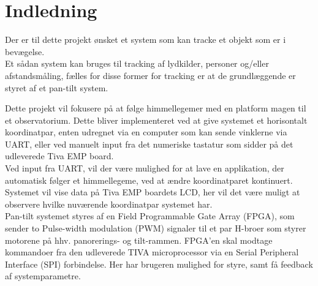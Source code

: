 \section{Indledning}
Der er til dette projekt ønsket et system som kan tracke et objekt som er i bevægelse.\\
Et sådan system kan bruges til tracking af lydkilder, personer og/eller afstandsmåling, fælles for disse former for tracking er at de grundlæggende er styret af et pan-tilt system.

Dette projekt vil fokusere på at følge himmellegemer med en platform magen til et observatorium. Dette bliver implementeret ved at give systemet et horisontalt koordinatpar, enten udregnet via en computer som kan sende vinklerne via UART, eller ved manuelt input fra det numeriske tastatur som sidder på det udleverede Tiva EMP board.\\
Ved input fra UART, vil der være mulighed for at lave en applikation, der automatisk følger et himmellegeme, ved at ændre koordinatparet kontinuert.
Systemet vil vise data på Tiva EMP boardets LCD, her vil det være muligt at observere hvilke nuværende koordinatpar systemet har.\\

Pan-tilt systemet styres af en Field Programmable Gate Array (FPGA), som sender to Pulse-width modulation (PWM) signaler til et par H-broer som styrer motorene på hhv. panorerings- og tilt-rammen.
FPGA’en skal modtage kommandoer fra den udleverede TIVA microprocessor via en Serial Peripheral Interface (SPI) forbindelse.
Her har brugeren mulighed for styre, samt få feedback af systemparametre.